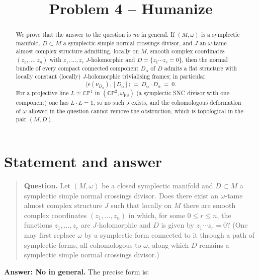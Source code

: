 \documentclass[11pt]{article}
\theoremstyle{definition}
\theoremstyle{remark}
\newcommand{\CP}{\mathbb{CP}}
\begin{document}
\title{Problem 4 -- Humanize}
\author{}
\date{}
\maketitle

\begin{abstract}
\noindent We prove that the answer to the question is \emph{no} in
general. If $(M,\omega)$ is a symplectic manifold, $D\subset M$ a
symplectic simple normal crossings divisor, and $J$ an $\omega$-tame
almost complex structure admitting, locally on $M$, smooth complex
coordinates $(z_1,\ldots,z_n)$ with $z_1,\ldots,z_r$
$J$-holomorphic and $D=\{z_1\cdots z_r=0\}$, then the normal bundle
of every compact connected component $D_\alpha$ of $D$ admits a flat
structure with locally constant (locally) $J$-holomorphic trivialising
frames; in particular
\[
\langle e(\nu_{D_\alpha}),[D_\alpha]\rangle\ =\
D_\alpha\cdot D_\alpha\ =\ 0 .
\]
For a projective line $L\cong\CP^1$ in $(\CP^2,\omega_{\mathrm{FS}})$
(a symplectic SNC divisor with one component) one has $L\cdot L=1$,
so no such $J$ exists, and the cohomologous deformation of $\omega$
allowed in the question cannot remove the obstruction, which is
topological in the pair $(M,D)$.
\end{abstract}

\section{Statement and answer}\label{sec:statement}

\begin{quote}
\textbf{Question.} Let $(M,\omega)$ be a closed symplectic manifold
and $D\subset M$ a symplectic simple normal crossings divisor. Does
there exist an $\omega$-tame almost complex structure $J$ such that
locally on $M$ there are smooth complex coordinates $(z_1,\ldots,z_n)$
in which, for some $0\le r\le n$, the functions $z_1,\ldots,z_r$ are
$J$-holomorphic and $D$ is given by $z_1\cdots z_r=0$? (One may first
replace $\omega$ by a symplectic form connected to it through a path
of symplectic forms, all cohomologous to $\omega$, along which $D$
remains a symplectic simple normal crossings divisor.)
\end{quote}

\medskip
\noindent\textbf{Answer: No in general.} The precise form is:
\end{document}
